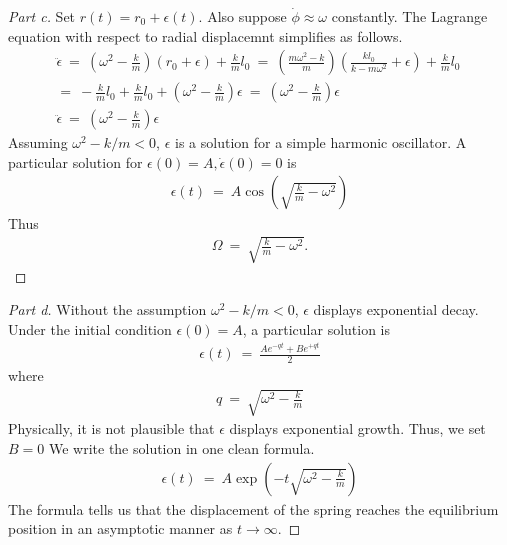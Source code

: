 \documentclass{article}
\numberwithin{equation}{section}
\begin{document}
\begin{proof}[Part c]
    Set $r(t) = r_0 + \epsilon(t)$. Also suppose $\dot \phi \approx \omega$ constantly. 
    The Lagrange equation with respect to radial displacemnt simplifies as follows. 
    \begin{align}
        \ddot \epsilon \ = \ \left(
            \omega^2 - \frac k m 
        \right) (r_0 + \epsilon) + \frac k m l_0  \ = \ 
        \left(
            \frac{m \omega^2 - k}{m} 
        \right)\left(
            \frac {k l_0} {k - m \omega^2} + \epsilon
        \right) + \frac k m l_0 \ \nonumber \\ = \ 
        - \frac k m l_0 + \frac k m l_0 + \left(
            \omega^2 - \frac k m
        \right)\epsilon \ = \ \left(
            \omega^2 - \frac k m
        \right)\epsilon \\ 
        \boxed{
            \ddot \epsilon \ = \ \left(
                \omega^2 - \frac k m 
            \right)\epsilon
        }
    \end{align} 
    Assuming $\omega^2 - k/m < 0$, $\epsilon$ is a solution for 
    a simple harmonic oscillator. A particular solution for 
    $\epsilon(0) = A, \dot \epsilon (0 ) = 0$ is 
    \begin{align}
            \epsilon(t) \ = \ A \cos\left(\sqrt{\frac k m - \omega^2}\right)
    \end{align}
    Thus
    \begin{align}
        \boxed{
            \Omega \ = \ \sqrt{\frac k m - \omega^2}
        }.
    \end{align}
\end{proof}


\begin{proof}[Part d]
        Without the assumption  $\omega^2 - k/m < 0$, $\epsilon$ displays 
    exponential decay. Under the initial condition $\epsilon(0) = A$, 
    a particular solution is 
    \begin{align}
        \epsilon(t) \ = \ \frac {A e^{-qt} + B e^{+qt}} 2 
    \end{align}
    where
    \begin{align}
        q \ = \ \sqrt{
            \omega^2 - \frac k m
        }
    \end{align}
    Physically, it is not plausible that $\epsilon$ displays exponential growth. 
    Thus, we set $B = 0$
    We write the solution in one clean formula. 
    \begin{align}
        \boxed{
            \epsilon(t) \ = \ A \exp\left(
                -t\sqrt{\omega^2 - \frac k m}
            \right)
        }
    \end{align}
    The formula tells us that the displacement of the spring reaches 
    the equilibrium position in an asymptotic manner as $t \rightarrow \infty$. 
\end{proof}
\end{document}
